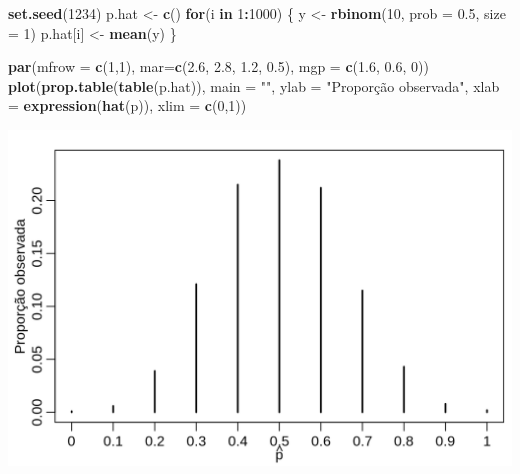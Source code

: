\documentclass[10pt,a4paper]{book}
\newenvironment{Shaded}{\begin{snugshade}}{\end{snugshade}}
\newcommand{\KeywordTok}[1]{\textcolor[rgb]{0.13,0.29,0.53}{\textbf{#1}}}
\newcommand{\DataTypeTok}[1]{\textcolor[rgb]{0.13,0.29,0.53}{#1}}
\newcommand{\DecValTok}[1]{\textcolor[rgb]{0.00,0.00,0.81}{#1}}
\newcommand{\FloatTok}[1]{\textcolor[rgb]{0.00,0.00,0.81}{#1}}
\newcommand{\StringTok}[1]{\textcolor[rgb]{0.31,0.60,0.02}{#1}}
\newcommand{\ControlFlowTok}[1]{\textcolor[rgb]{0.13,0.29,0.53}{\textbf{#1}}}
\newcommand{\OperatorTok}[1]{\textcolor[rgb]{0.81,0.36,0.00}{\textbf{#1}}}
\newcommand{\NormalTok}[1]{#1}
\begin{document}
\begin{Shaded}
\begin{Highlighting}[]
\KeywordTok{set.seed}\NormalTok{(}\DecValTok{1234}\NormalTok{)}
\NormalTok{p.hat <-}\StringTok{ }\KeywordTok{c}\NormalTok{()}
\ControlFlowTok{for}\NormalTok{(i }\ControlFlowTok{in} \DecValTok{1}\OperatorTok{:}\DecValTok{1000}\NormalTok{) \{}
\NormalTok{  y <-}\StringTok{ }\KeywordTok{rbinom}\NormalTok{(}\DecValTok{10}\NormalTok{, }\DataTypeTok{prob =} \FloatTok{0.5}\NormalTok{, }\DataTypeTok{size =} \DecValTok{1}\NormalTok{)}
\NormalTok{  p.hat[i] <-}\StringTok{ }\KeywordTok{mean}\NormalTok{(y)}
\NormalTok{\}}
\end{Highlighting}
\end{Shaded}

\begin{Shaded}
\begin{Highlighting}[]
\KeywordTok{par}\NormalTok{(}\DataTypeTok{mfrow =} \KeywordTok{c}\NormalTok{(}\DecValTok{1}\NormalTok{,}\DecValTok{1}\NormalTok{), }\DataTypeTok{mar=}\KeywordTok{c}\NormalTok{(}\FloatTok{2.6}\NormalTok{, }\FloatTok{2.8}\NormalTok{, }\FloatTok{1.2}\NormalTok{, }\FloatTok{0.5}\NormalTok{), }\DataTypeTok{mgp =} \KeywordTok{c}\NormalTok{(}\FloatTok{1.6}\NormalTok{, }\FloatTok{0.6}\NormalTok{, }\DecValTok{0}\NormalTok{))}
\KeywordTok{plot}\NormalTok{(}\KeywordTok{prop.table}\NormalTok{(}\KeywordTok{table}\NormalTok{(p.hat)), }\DataTypeTok{main =} \StringTok{""}\NormalTok{, }
     \DataTypeTok{ylab =} \StringTok{"Proporção observada"}\NormalTok{,}
     \DataTypeTok{xlab =} \KeywordTok{expression}\NormalTok{(}\KeywordTok{hat}\NormalTok{(p)), }\DataTypeTok{xlim =} \KeywordTok{c}\NormalTok{(}\DecValTok{0}\NormalTok{,}\DecValTok{1}\NormalTok{))}
\end{Highlighting}
\end{Shaded}

\begin{center}\includegraphics{figures/unnamed-chunk-380-1} \end{center}
\end{document}
